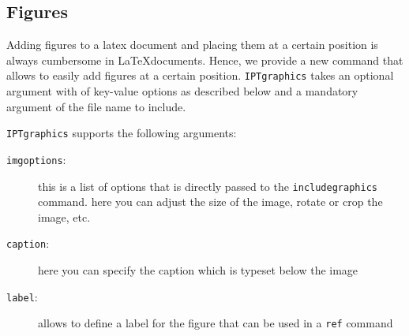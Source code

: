 

\subsection{Figures}

Adding figures to a latex document and placing them at a certain position is always cumbersome in \LaTeX documents. Hence, we provide a new command \texttt{} that allows to easily add figures at a certain position. 
\texttt{IPTgraphics} takes an optional argument with of key-value options as described below and a mandatory argument of the file name to include.

\texttt{IPTgraphics} supports the following arguments:
\begin{description}
	\item[\texttt{imgoptions}:] this is a list of options that is directly passed to the \texttt{\bs{}includegraphics} command. here you can adjust the size of the image, rotate or crop the image, etc.
	\item[\texttt{caption}:] here you can specify the caption which is typeset below the image
	\item[\texttt{label}:] allows to define a label for the figure that can be used in a \texttt{\bs{}ref} command
\end{description}

